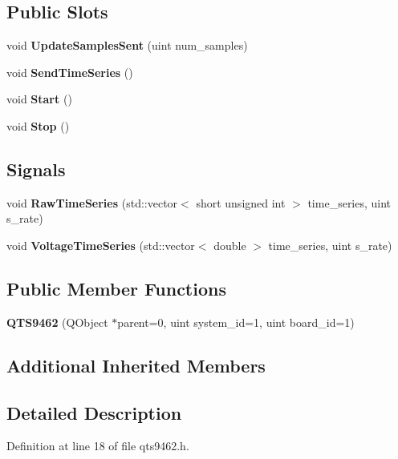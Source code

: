 \subsection*{Public Slots}
\begin{DoxyCompactItemize}
\item 
void {\bfseries Update\+Samples\+Sent} (uint num\+\_\+samples)\hypertarget{class_q_t_s9462_a4f8594f3594d17bc620f461940b9c363}{}\label{class_q_t_s9462_a4f8594f3594d17bc620f461940b9c363}

\item 
void {\bfseries Send\+Time\+Series} ()\hypertarget{class_q_t_s9462_a8ebb7837f39380fa67e3d206de57d332}{}\label{class_q_t_s9462_a8ebb7837f39380fa67e3d206de57d332}

\item 
void {\bfseries Start} ()\hypertarget{class_q_t_s9462_a3d47467dc91daadd830b52259dde71ab}{}\label{class_q_t_s9462_a3d47467dc91daadd830b52259dde71ab}

\item 
void {\bfseries Stop} ()\hypertarget{class_q_t_s9462_af1fac33559f85b79918e7b74aecb1e0c}{}\label{class_q_t_s9462_af1fac33559f85b79918e7b74aecb1e0c}

\end{DoxyCompactItemize}
\subsection*{Signals}
\begin{DoxyCompactItemize}
\item 
void {\bfseries Raw\+Time\+Series} (std\+::vector$<$ short unsigned int $>$ time\+\_\+series, uint s\+\_\+rate)\hypertarget{class_q_t_s9462_a0c2f091b771c1737a9d217206cb3db1d}{}\label{class_q_t_s9462_a0c2f091b771c1737a9d217206cb3db1d}

\item 
void {\bfseries Voltage\+Time\+Series} (std\+::vector$<$ double $>$ time\+\_\+series, uint s\+\_\+rate)\hypertarget{class_q_t_s9462_a0b89d044f501bb3ccde93f6c95235247}{}\label{class_q_t_s9462_a0b89d044f501bb3ccde93f6c95235247}

\end{DoxyCompactItemize}
\subsection*{Public Member Functions}
\begin{DoxyCompactItemize}
\item 
{\bfseries Q\+T\+S9462} (Q\+Object $\ast$parent=0, uint system\+\_\+id=1, uint board\+\_\+id=1)\hypertarget{class_q_t_s9462_a593b946f814029a41a2efe72e6a91b48}{}\label{class_q_t_s9462_a593b946f814029a41a2efe72e6a91b48}

\end{DoxyCompactItemize}
\subsection*{Additional Inherited Members}


\subsection{Detailed Description}


Definition at line 18 of file qts9462.\+h.

